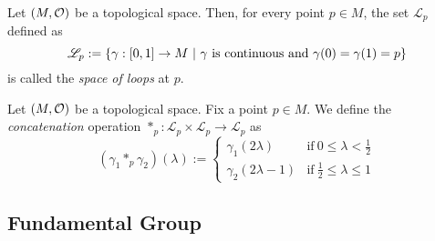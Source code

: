 \begin{definition}\label{def:space_of_loops}
	Let \((M, \mathcal{O})\) be a topological space. Then, for every point \(p \in M\), the set \(\mathscr{L}_p\) defined as
	\begin{equation}
		\mathscr{L}_p := \qty{\gamma: [0, 1] \to M \ \middle|\ \gamma \ \text{is continuous and}\ \gamma(0) = \gamma(1) = p} \label{eq:space_of_loops}
	\end{equation}
	is called the \emph{space of loops} at \(p\).
\end{definition}

\begin{definition}\label{def:concatenation_of_loops}
	Let \((M, \mathcal{O})\) be a topological space. Fix a point \(p \in M\). We define the \emph{concatenation} operation \(\ast_p: \mathscr{L}_p \times \mathscr{L}_p \to \mathscr{L}_p\) as
	\begin{equation}
		(\gamma_1 \ast_p \gamma_2)(\lambda) := \begin{cases}
			\gamma_1(2\lambda)     & \text{if}\ 0 \le \lambda < \frac{1}{2}   \\
			\gamma_2(2\lambda - 1) & \text{if}\ \frac{1}{2} \le \lambda \le 1
		\end{cases} \label{eq:concatenation_of_loops}
	\end{equation}
\end{definition}

\subsection{Fundamental Group}

